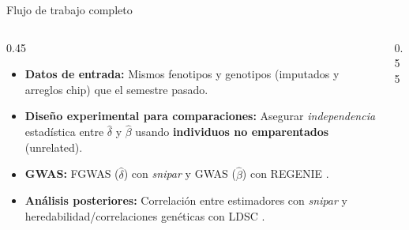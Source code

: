 \begin{frame}{Flujo de trabajo completo}
  \begin{columns}[c]
    \begin{column}{0.45\textwidth}
      {\footnotesize\sffamily
        \begin{itemize}
          \item<2-> \textcolor{datastroke}{\textbf{Datos de entrada:}} Mismos fenotipos y genotipos (imputados y arreglos chip) que el semestre pasado.
          \item<3-> \textcolor{subsetstroke}{\textbf{Diseño experimental para comparaciones:}} Asegurar \textit{independencia} estadística entre $\hat{\delta}$ y $\hat{\beta}$ usando \textbf{individuos no emparentados} (unrelated).
          \item<4-> \textcolor{gwasstroke}{\textbf{GWAS:}} FGWAS ($\hat{\delta}$) con \textit{snipar} \parencite{young2022-fgwas,guan2025-fgwas} y GWAS ($\hat{\beta}$) con REGENIE \parencite{mbatchou2021-regenie}.
          \item<5-> \textcolor{poststroke}{\textbf{Análisis posteriores:}} Correlación entre estimadores con \textit{snipar} \parencite{young2022-fgwas} y heredabilidad/correlaciones genéticas con LDSC \parencite{bulik-sullivan2015-ldsc}.
        \end{itemize}
      }
    \end{column}

    \begin{column}{0.55\textwidth}
      \centering
\end{column}
\end{columns}
\end{frame}
